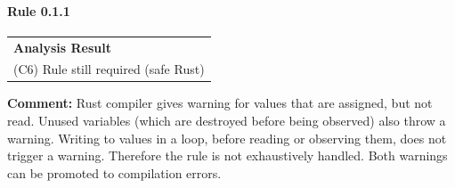 \paragraph{Rule 0.1.1}
\begin{longtable}{p{13cm}}
\textbf{Analysis Result} \\
(C6) Rule still required (safe Rust) \\
\end{longtable}
\textbf{Comment:} Rust compiler gives warning for values that are assigned, but not read. Unused variables (which are destroyed before being observed) also throw a warning. Writing to values in a loop, before reading or observing them, does not trigger a warning. Therefore the rule is not exhaustively handled. Both warnings can be promoted to compilation errors. \\


